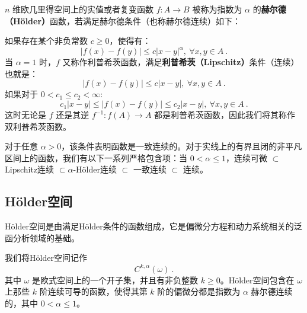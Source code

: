 \begin{issues}
\issueDraft
\end{issues}
$n$ 维欧几里得空间上的实值或者复变函数 $f:A \rightarrow B$ 被称为指数为 $\alpha$ 的\textbf{赫尔德（Hölder）}函数，若满足赫尔德条件（也称赫尔德连续）如下：

如果存在某个非负常数 $c\geq 0$，使得有：
\begin{equation}
|f(x)-f(y)|\leq c|x-y|^\alpha,\ \forall x,y \in A~.
\end{equation}
当 $\alpha=1$ 时，$f$ 又称作利普希茨函数，满足\textbf{利普希茨（Lipschitz）}条件（连续）也就是：
\begin{equation}
|f(x)-f(y)|\leq c|x-y|,\ \forall x,y \in A~.
\end{equation}
如果对于 $0<c_1\leq c_2<\infty $:
\begin{equation}
c_1|x-y|\leq |f(x)-f(y)|\leq  c_2|x-y|,\ \forall x,y \in A~.
\end{equation}
这时无论是 $f$ 还是其逆 $f^{-1}:f(A)\rightarrow A$ 都是利普希茨函数，因此我们将其称作双利普希茨函数。

对于任意 $\alpha > 0$，该条件表明函数是一致连续的。对于实线上的有界且闭的非平凡区间上的函数，我们有以下一系列严格包含项：当 $0<\alpha\leq 1$，连续可微 $\subset$Lipschitz连续 $\subset\alpha$-Hölder连续 $\subset$ 一致连续 $\subset$ 连续。
\subsection{Hölder空间}
Hölder空间是由满足Hölder条件的函数组成，它是偏微分方程和动力系统相关的泛函分析领域的基础。

我们将Hölder空间记作
\begin{equation}
C^{k,\alpha}(\omega)~.
\end{equation}
其中 $\omega$ 是欧式空间上的一个开子集，并且有非负整数 $k\geq 0$。Hölder空间包含在 $\omega$ 上那些 $k$ 阶连续可导的函数，使得其第 $k$ 阶的偏微分都是指数为 $\alpha$ 赫尔德连续的，其中 $0<\alpha\leq 1$。
